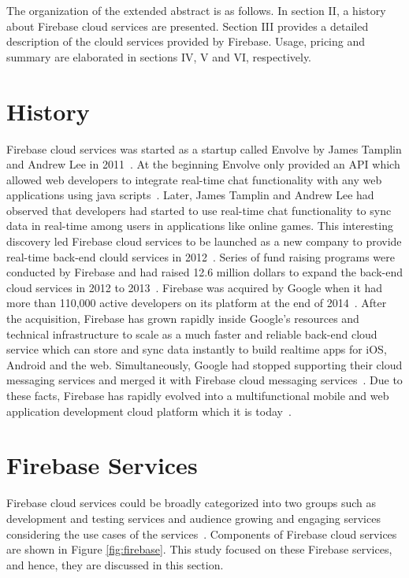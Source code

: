 The organization of the extended abstract is as follows. In section II, a history about
Firebase cloud services are presented. Section III provides a detailed
description of the clould services provided by Firebase. Usage, pricing and
summary are elaborated in sections IV, V and VI, respectively.

\section{History}

Firebase cloud services was started as a startup called Envolve by James Tamplin
and Andrew Lee in 2011~\cite{hid-sp18-409-www-firebase-wikipedia}. At the
beginning Envolve only provided an API which allowed web developers to integrate
real-time chat functionality with any web applications using java
scripts~\cite{hid-sp18-409-www-firebase}. Later, James Tamplin and Andrew Lee
had observed that developers had started to use real-time chat functionality to
sync data in real-time among users in applications like online games. This
interesting discovery led Firebase cloud services to be launched as a new
company to provide real-time back-end clould services in
2012~\cite{hid-sp18-409-www-firebase-wikipedia}. Series of fund raising programs
were conducted by Firebase and had raised 12.6 million dollars to expand the
back-end cloud services in 2012 to 2013~\cite{hid-sp18-409-www-firebase}.
Firebase was acquired by Google when it had more than 110,000 active developers
on its platform  at the end of 2014~\cite{hid-sp18-409-www-firebase-acquired}.
After the acquisition, Firebase has grown rapidly inside Google's resources and
technical infrastructure to scale as a much faster and reliable back-end cloud
service which can store and sync data instantly to build realtime apps for iOS,
Android and the web. Simultaneously, Google had stopped supporting their cloud
messaging services and merged it with Firebase cloud messaging
services~\cite{hid-sp18-409-www-firebase-merged}. Due to these facts, Firebase
has rapidly evolved into a multifunctional mobile and web application
development cloud platform which it is
today~\cite{hid-sp18-409-www-firebase-official}.

\section{Firebase Services}

Firebase cloud services could be broadly categorized into two groups such as
development and testing services and audience growing and engaging services
considering the use cases of the
services~\cite{hid-sp18-409-www-firebase-products}. Components of Firebase cloud
services are shown in Figure \ref{fig:firebase}. This study focused on these
Firebase services, and hence, they are discussed in this section.

